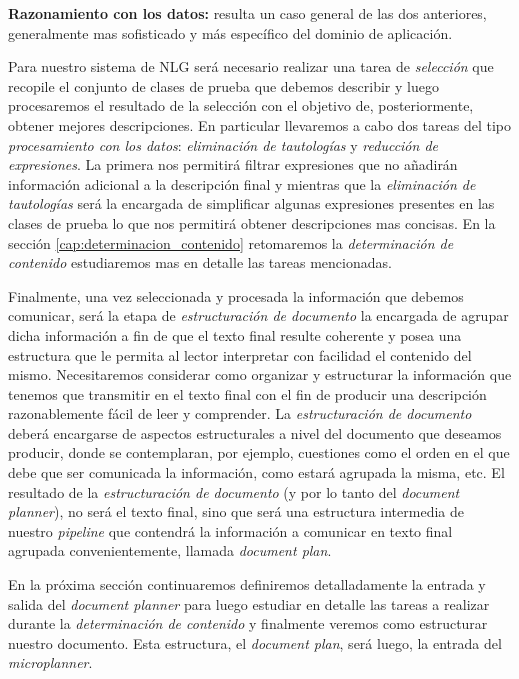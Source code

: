 \bigskip
\noindent
\textbf{Razonamiento con los datos:} resulta un caso general de las dos anteriores, generalmente mas sofisticado y más específico del dominio de aplicación. 

Para nuestro sistema de NLG será necesario realizar una tarea de \emph{selección} que recopile el conjunto de clases de prueba que debemos describir y luego procesaremos el resultado de la selección con el objetivo de, posteriormente, obtener mejores descripciones. En particular llevaremos a cabo dos tareas del tipo \emph{procesamiento con los datos}: \emph{eliminación de tautologías} y \emph{reducción de expresiones}. La primera nos permitirá filtrar expresiones que no añadirán información adicional a la descripción final y mientras que la \emph{eliminación de tautologías} será la encargada de simplificar algunas expresiones presentes en las clases de prueba lo que nos permitirá obtener descripciones mas concisas. En la sección \ref{cap:determinacion_contenido} retomaremos la \emph{determinación de contenido} estudiaremos mas en detalle las tareas mencionadas.

Finalmente, una vez seleccionada y procesada la información que debemos comunicar, será la etapa de \emph{estructuración de documento} la encargada de agrupar dicha información a fin de que el texto final resulte coherente y posea una estructura que le permita al lector interpretar con facilidad el contenido del mismo. Necesitaremos considerar como organizar y estructurar la información que tenemos que transmitir en el texto final con el fin de producir una descripción razonablemente fácil de leer y comprender. La \emph{estructuración de documento} deberá encargarse de aspectos estructurales a nivel del documento que deseamos producir, donde se contemplaran, por ejemplo, cuestiones como el orden en el que debe que ser comunicada la información, como estará agrupada la misma, etc. El resultado de la \emph{estructuración de documento} (y por lo tanto del \textit{document planner}), no será el texto final, sino que será una estructura intermedia de nuestro \textit{pipeline} que contendrá la información a comunicar en texto final agrupada convenientemente, llamada \emph{document plan}. 

En la próxima sección continuaremos definiremos detalladamente la entrada y salida del \textit{document planner} para luego estudiar en detalle las tareas a realizar durante la \emph{determinación de contenido} y finalmente veremos como estructurar nuestro documento. Esta estructura, el \emph{document plan}, será luego, la entrada del \emph{microplanner}.

